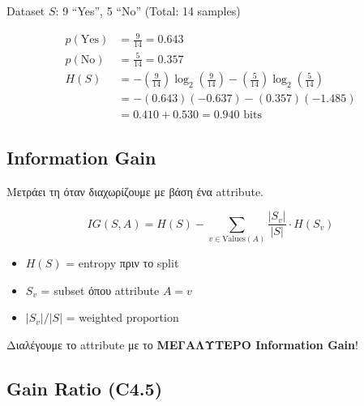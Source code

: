 \begin{examplebox}
Dataset $S$: 9 ``Yes'', 5 ``No'' (Total: 14 samples)

\begin{align*}
p(\text{Yes}) &= \frac{9}{14} = 0.643 \\
p(\text{No}) &= \frac{5}{14} = 0.357 \\[10pt]
H(S) &= -\left(\frac{9}{14}\right)\log_2\left(\frac{9}{14}\right) - \left(\frac{5}{14}\right)\log_2\left(\frac{5}{14}\right) \\
&= -(0.643)(-0.637) - (0.357)(-1.485) \\
&= 0.410 + 0.530 = \boxed{0.940 \text{ bits}}
\end{align*}
\end{examplebox}

\subsection{Information Gain}

Μετράει τη  όταν διαχωρίζουμε με βάση ένα attribute.

\begin{formulabox}
\begin{equation}
IG(S, A) = H(S) - \sum_{v \in \text{Values}(A)} \frac{|S_v|}{|S|} \cdot H(S_v)
\end{equation}

\begin{itemize}
    \item $H(S)$ = entropy πριν το split
    \item $S_v$ = subset όπου attribute $A = v$
    \item $|S_v|/|S|$ = weighted proportion
\end{itemize}
\end{formulabox}

\begin{warningbox}
Διαλέγουμε το attribute με το \textbf{ΜΕΓΑΛΥΤΕΡΟ Information Gain}!
\end{warningbox}

\subsection{Gain Ratio (C4.5)}

